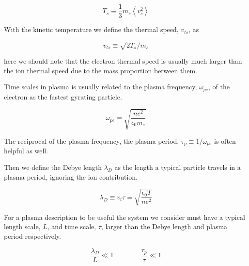         \[T_s \equiv \frac{1}{3}m_s \left< v_s^2 \right> \]

        With the kinetic temperature we define the thermal speed, \(v_{ts}\), as

        \[ v_{ts} \equiv \sqrt{2T_s}/m_s \]

        here we should note that the electron thermal speed is usually much larger
        than the ion thermal speed due to the mass proportion between them.

        Time scales in plasma is usually related to the plasma frequency, \(\omega_{pe}\), of the
        electron as the fastest gyrating particle.

        \[ \omega_{pe} = \sqrt{\frac{ne^2}{\epsilon_0 m_e}} \]

        The reciprocal of the plasma frequency, the plasma period, \(\tau_p \equiv 1/\omega_{pe}\) is often
        helpful as well.

        Then we define the Debye length \(\lambda_D\) as the length a typical particle
        travels in a plasma period, ignoring the ion contribution.

        \[\lambda_D \equiv v_t \tau = \sqrt{\frac{\epsilon_0 T}{n e^2}}\]

        For a plasma description to be useful the system we consider must have
        a typical length scale, \(L\), and time scale, \(\tau\), larger than the Debye length and plasma
        period respectively.

        \[\frac{\lambda_D}{L} \ll 1  \qquad{} \qquad \frac{\tau_p}{\tau} \ll 1 \]


















